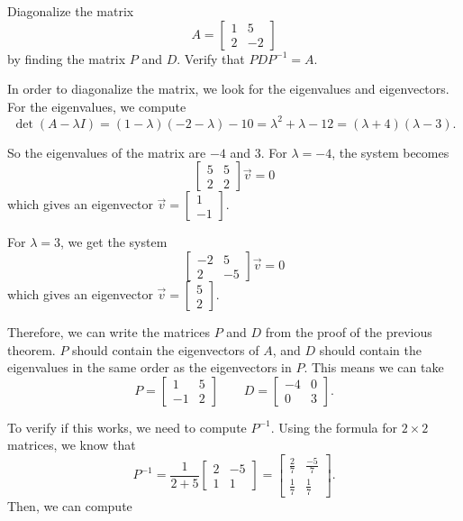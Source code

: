 \begin{example}
Diagonalize the matrix 
\[ A = \begin{bmatrix} 1 & 5 \\ 2 & -2 \end{bmatrix} \] by finding the matrix $P$ and $D$. Verify that $PDP^{-1} = A$. 
\end{example}

\begin{exampleSol}
In order to diagonalize the matrix, we look for the eigenvalues and eigenvectors. For the eigenvalues, we compute
\[ \det(A - \lambda I) = (1-\lambda)(-2-\lambda) - 10 = \lambda^2 + \lambda - 12 = (\lambda +4)(\lambda - 3). \]

So the eigenvalues of the matrix are $-4$ and $3$. For $\lambda = -4$, the system becomes
\[ \begin{bmatrix} 5 & 5 \\ 2 & 2 \end{bmatrix} \vec{v} = 0 \] which gives an eigenvector $\vec{v} = \begin{bmatrix} 1 \\ -1 \end{bmatrix}$. 

For $\lambda = 3$, we get the system
\[ \begin{bmatrix} -2 & 5 \\ 2 & -5 \end{bmatrix}\vec{v} = 0 \] which gives an eigenvector $\vec{v} = \begin{bmatrix} 5 \\ 2 \end{bmatrix}.$

Therefore, we can write the matrices $P$ and $D$ from the proof of the previous theorem. $P$ should contain the eigenvectors of $A$, and $D$ should contain the eigenvalues in the same order as the eigenvectors in $P$. This means we can take
\[ P = \begin{bmatrix} 1 & 5 \\ -1 & 2 \end{bmatrix} \qquad D = \begin{bmatrix} -4 & 0 \\ 0 & 3 \end{bmatrix}.\]

To verify if this works, we need to compute $P^{-1}.$ Using the formula for $2\times 2$ matrices, we know that
\[ P^{-1} = \frac{1}{2 + 5}\begin{bmatrix} 2 & -5 \\ 1 & 1 \end{bmatrix} = \begin{bmatrix} \frac{2}{7} & \frac{-5}{7} \\ \frac{1}{7} & \frac{1}{7}\end{bmatrix}. \] Then, we can compute


\end{exampleSol}
